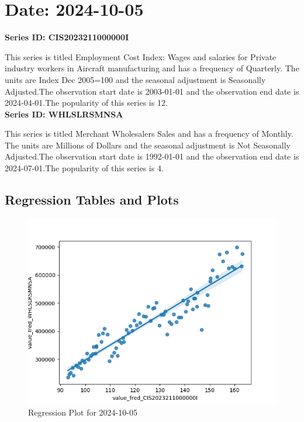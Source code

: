 \section{Date: 2024-10-05}
\noindent \textbf{Series ID: CIS2023211000000I} 

\noindent This series is titled Employment Cost Index: Wages and salaries for Private industry workers in Aircraft manufacturing and has a frequency of Quarterly. The units are Index Dec 2005=100 and the seasonal adjustment is Seasonally Adjusted.The observation start date is 2003-01-01 and the observation end date is 2024-04-01.The popularity of this series is 12. \\ 

\noindent \textbf{Series ID: WHLSLRSMNSA} 

\noindent This series is titled Merchant Wholesalers Sales and has a frequency of Monthly. The units are Millions of Dollars and the seasonal adjustment is Not Seasonally Adjusted.The observation start date is 1992-01-01 and the observation end date is 2024-07-01.The popularity of this series is 4. \\ 

\subsection{Regression Tables and Plots}


\begin{figure}
\centering
\includegraphics[scale = 0.9]{plots/plot_2024-10-05.png}
\caption{Regression Plot for 2024-10-05}
\end{figure}
\newpage
